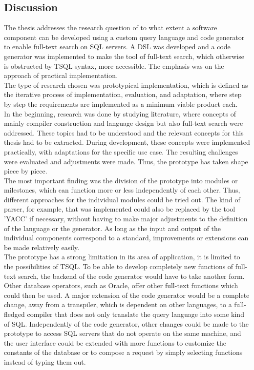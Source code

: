 \newpage
\subsection{Discussion}
The thesis addresses the research question of to what extent a software component can be developed using a custom query language and code generator to enable full-text search on \ac{SQL} servers. A \ac{DSL} was developed and a code generator was implemented to make the tool of full-text search, which otherwise is obstructed by \ac{TSQL} syntax, more accessible. The emphasis was on the approach of practical implementation.\\
The type of research chosen was prototypical implementation, which is defined as the iterative process of implementation, evaluation, and adaptation, where step by step the requirements are implemented as a minimum viable product each.\\
In the beginning, research was done by studying literature, where concepts of mainly compiler construction and language design but also full-text search were addressed. These topics had to be understood and the relevant concepts for this thesis had to be extracted. During development, these concepts were implemented practically, with adaptations for the specific use case. The resulting challenges were evaluated and adjustments were made. Thus, the prototype has taken shape piece by piece.\\
The most important finding was the division of the prototype into modules or milestones, which can function more or less independently of each other. Thus, different approaches for the individual modules could be tried out. The kind of parser, for example, that was implemented could also be replaced by the tool 'YACC' if necessary, without having to make major adjustments to the definition of the language or the generator. As long as the input and output of the individual components correspond to a standard, improvements or extensions can be made relatively easily.\\
The prototype has a strong limitation in its area of application, it is limited to the possibilities of \ac{TSQL}. To be able to develop completely new functions of full-text search, the backend of the code generator would have to take another form. Other database operators, such as Oracle, offer other full-text functions which could then be used. A major extension of the code generator would be a complete change, away from a transpiler, which is dependent on other languages, to a full-fledged compiler that does not only translate the query language into some kind of \ac{SQL}. Independently of the code generator, other changes could be made to the prototype to access \ac{SQL} servers that do not operate on the same machine, and the user interface could be extended with more functions to customize the constants of the database or to compose a request by simply selecting functions instead of typing them out.